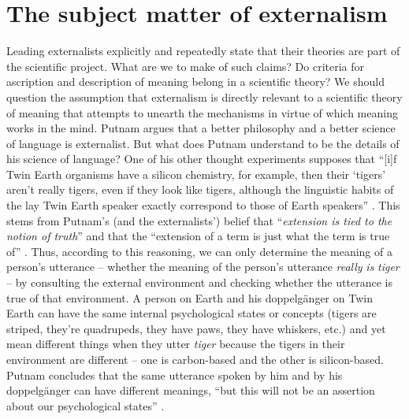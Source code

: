 \section{The subject matter of externalism}
Leading externalists explicitly and repeatedly state that their theories are part of the scientific project. What are we to make of such claims? Do criteria for ascription and description of meaning belong in a scientific theory? We should question the assumption that externalism is directly relevant to a scientific theory of meaning that attempts to unearth the mechanisms in virtue of which meaning works in the mind. Putnam argues that a better philosophy and a better science of language is externalist. But what does Putnam understand to be the details of his science of language? One of his other thought experiments supposes that “[i]f Twin Earth organisms have a silicon chemistry, for example, then their ‘tigers’ aren’t really tigers, even if they look like tigers, although the linguistic habits of the lay Twin Earth speaker exactly correspond to those of Earth speakers” \citep[167]{Putnam1975}. This stems from Putnam’s (and the externalists’) belief that “\textit{extension is tied to the notion of truth}” and that the “extension of a term is just what the term is true of” \citep[154, emphasis in original]{Putnam1975}. Thus, according to this reasoning, we can only determine the meaning of a person’s utterance – whether the meaning of the person’s utterance \textit{really} \textit{is} \textit{tiger} – by consulting the external environment and checking whether the utterance is true of that environment. A person on Earth and his doppelgänger on Twin Earth can have the same internal psychological states or concepts (tigers are striped, they’re quadrupeds, they have paws, they have whiskers, etc.) and yet mean different things when they utter \textit{tiger} because the tigers in their environment are different – one is carbon-based and the other is silicon-based. Putnam concludes that the same utterance spoken by him and by his doppelgänger can have different meanings, “but this will not be an assertion about our psychological states” \citep[165]{Putnam1975}. 

